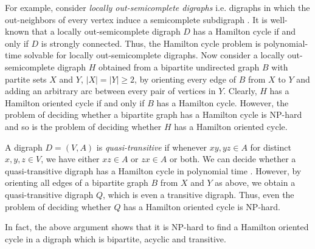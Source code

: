 \documentclass{article}
\newcommand{\GGn}[1]{{#1}}
\newcommand{\YLn}[1]{{#1}}
\newcommand{\2}{\vspace{0.2cm}}
\begin{document}
For example, consider {\em locally out-semicomplete digraphs} i.e. digraphs in which the out-neighbors of every vertex induce a semicomplete subdigraph \cite{B}. 
It is well-known that a locally out-semicomplete digraph $D$ has a Hamilton cycle if and only if $D$ is strongly connected. Thus, the Hamilton cycle problem is polynomial-time solvable for locally out-semicomplete digraphs. Now consider a locally out-semicomplete digraph $H$ obtained from a bipartite undirected graph $B$ with partite sets $X$ and $Y$, $|X|=|Y|\ge 2$, by orienting every edge of $B$ from $X$ to $Y$ and adding an arbitrary arc between every pair of vertices in $Y$. Clearly, $H$ has  a Hamilton oriented cycle if and only if $B$ has a Hamilton cycle. However, the problem of deciding whether a bipartite graph has a Hamilton cycle is {\sf NP}-hard and so is the problem of deciding whether $H$ has a Hamilton oriented cycle.


A digraph $D=(V,A)$ is {\em quasi-transitive} if whenever $xy,yz\in A$ for distinct $x,y,z\in V$, we have either $xz\in A$ or $zx\in A$ or both.
We can decide whether a quasi-transitive digraph has a Hamilton cycle in polynomial time \cite{G94}. However, by orienting all edges of a bipartite graph $B$ from $X$ and $Y$ as above, we obtain a quasi-transitive digraph $Q$, which is even a transitive digraph. Thus,  even the problem of deciding whether $Q$ has a Hamilton oriented cycle is {\sf NP}-hard.


\GGn{In fact, the above argument shows that it is {\sf NP}-hard to find a Hamilton oriented cycle in a digraph which is bipartite, acyclic and transitive. }


\end{document}
